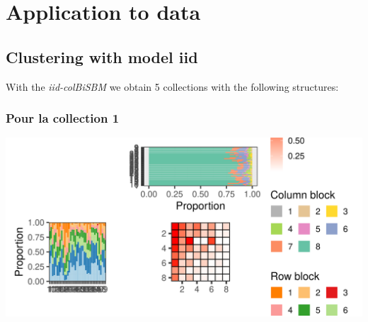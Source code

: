 \hypertarget{application-to-data}{%
\section{\texorpdfstring{Application to
\cite{doreRelativeEffectsAnthropogenic2021}
data}{Application to  data}}\label{application-to-data}}

\label{sec:application-to-dorerelativeeffectsanthropogenic2021-data}

\hypertarget{clustering-with-model-iid}{%
\subsection{Clustering with model iid}\label{clustering-with-model-iid}}

With the \emph{iid-colBiSBM} we obtain 5 collections with the following
structures:

\subsubsection{Pour la collection 1 }

\includegraphics{./img/4c7e9819bb707372d35035947dfe7848b594b688.png}\newline \tiny

